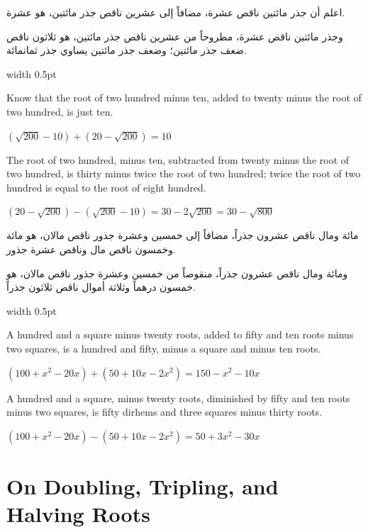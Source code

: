 \documentclass[10pt,a4paper]{book}
\newlength{\colwidth}
\newcommand{\bilingualpair}[2]{%
  \noindent
  \begin{minipage}[t]{\colwidth}
  \begin{flushright}
  \vspace{0pt}
  {\arabicfont\small #1}
  \end{flushright}
  \end{minipage}%
  \hfill\textcolor{columnsepclr}{\vrule width 0.5pt}\hfill
  \begin{minipage}[t]{\colwidth}
  \vspace{0pt}
  {\small #2}
  \end{minipage}%
  \par\vspace{0.6em}
}
\begin{document}
\bilingualpair{
اعلم أن جذر مائتين ناقص عشرة، مضافاً إلى عشرين ناقص جذر
مائتين، هو عشرة.

وجذر مائتين ناقص عشرة، مطروحاً من عشرين ناقص جذر مائتين،
هو ثلاثون ناقص ضعف جذر مائتين؛ وضعف جذر مائتين يساوي جذر
ثمانمائة.
}{
Know that the root of two hundred minus ten, added to twenty minus the root
of two hundred, is just ten.

$(\sqrt{200} - 10) + (20 - \sqrt{200}) = 10$

The root of two hundred, minus ten, subtracted from twenty minus the root of
two hundred, is thirty minus twice the root of two hundred; twice the root of
two hundred is equal to the root of eight hundred.

$(20 - \sqrt{200}) - (\sqrt{200} - 10) = 30 - 2\sqrt{200} = 30 - \sqrt{800}$
}

\bilingualpair{
مائة ومال ناقص عشرون جذراً، مضافاً إلى خمسين وعشرة جذور
ناقص مالان، هو مائة وخمسون ناقص مال وناقص عشرة جذور.

ومائة ومال ناقص عشرون جذراً، منقوصاً من خمسين وعشرة جذور
ناقص مالان، هو خمسون درهماً وثلاثة أموال ناقص ثلاثون جذراً.
}{
A hundred and a square minus twenty roots, added to fifty and ten roots minus
two squares, is a hundred and fifty, minus a square and minus ten roots.

$(100 + x^2 - 20x) + (50 + 10x - 2x^2) = 150 - x^2 - 10x$

A hundred and a square, minus twenty roots, diminished by fifty and ten roots
minus two squares, is fifty dirhems and three squares minus thirty roots.

$(100 + x^2 - 20x) - (50 + 10x - 2x^2) = 50 + 3x^2 - 30x$
}

\section{On Doubling, Tripling, and Halving Roots}
\end{document}
